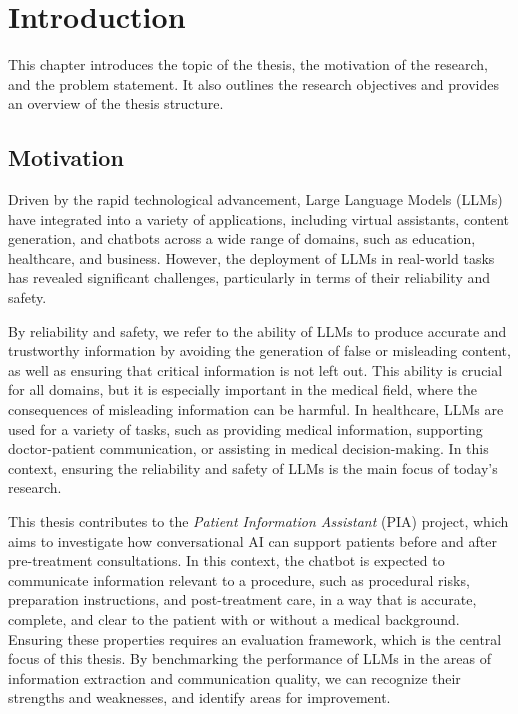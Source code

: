 \chapter{Introduction}

This chapter introduces the topic of the thesis, the motivation of the research, and the problem statement. It also outlines the research objectives and provides an overview of the thesis structure.

\section{Motivation}

Driven by the rapid technological advancement, Large Language Models (LLMs) have integrated into a variety of applications, including virtual assistants, content generation, and chatbots across a wide range of domains, such as education, healthcare, and business. 
However, the deployment of LLMs in real-world tasks has revealed significant challenges, particularly in terms of their reliability and safety. 

By reliability and safety, we refer to the ability of LLMs to produce accurate and trustworthy information by avoiding the generation of false or misleading content, as well as ensuring that critical information is not left out. 
This ability is crucial for all domains, but it is especially important in the medical field, where the consequences of misleading information can be harmful. 
In healthcare, LLMs are used for a variety of tasks, such as providing medical information, supporting doctor-patient communication, or assisting in medical decision-making. 
In this context, ensuring the reliability and safety of LLMs is the main focus of today's research. 

This thesis contributes to the \textit{Patient Information Assistant} (PIA) project, which aims to investigate how conversational AI can support patients before and after pre-treatment consultations.
In this context, the chatbot is expected to communicate information relevant to a procedure, such as procedural risks, preparation instructions, and post-treatment care, in a way that is accurate, complete, and clear to the patient with or without a medical background.
Ensuring these properties requires an evaluation framework, which is the central focus of this thesis.
By benchmarking the performance of LLMs in the areas of information extraction and communication quality, we can recognize their strengths and weaknesses, and identify areas for improvement. 

